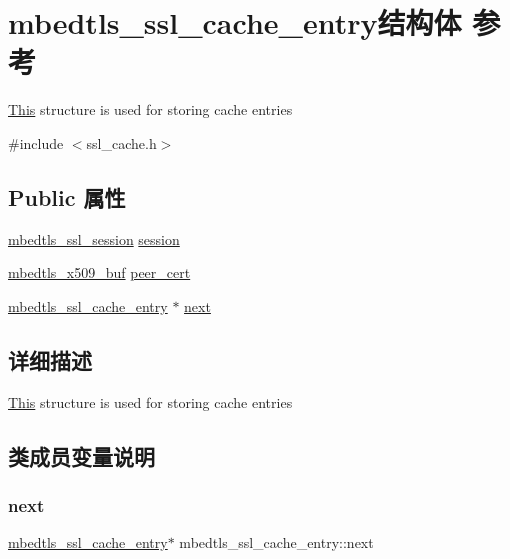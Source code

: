 \hypertarget{structmbedtls__ssl__cache__entry}{}\section{mbedtls\+\_\+ssl\+\_\+cache\+\_\+entry结构体 参考}
\label{structmbedtls__ssl__cache__entry}


\hyperlink{namespace_this}{This} structure is used for storing cache entries  




{\ttfamily \#include $<$ssl\+\_\+cache.\+h$>$}

\subsection*{Public 属性}
\begin{DoxyCompactItemize}
\item 
\hyperlink{structmbedtls__ssl__session}{mbedtls\+\_\+ssl\+\_\+session} \hyperlink{structmbedtls__ssl__cache__entry_ade27f016c0924422c5ba5e68650744bc}{session}
\item 
\hyperlink{group__x509__module_ga4d02c9e8e4e2934555e0d132cd2976dc}{mbedtls\+\_\+x509\+\_\+buf} \hyperlink{structmbedtls__ssl__cache__entry_aaa3550f088fef5e3e2ea793076d77a86}{peer\+\_\+cert}
\item 
\hyperlink{structmbedtls__ssl__cache__entry}{mbedtls\+\_\+ssl\+\_\+cache\+\_\+entry} $\ast$ \hyperlink{structmbedtls__ssl__cache__entry_a83fee0c73af53bc816d6a5f2ac795481}{next}
\end{DoxyCompactItemize}


\subsection{详细描述}
\hyperlink{namespace_this}{This} structure is used for storing cache entries 

\subsection{类成员变量说明}
\mbox{\label{structmbedtls__ssl__cache__entry_a83fee0c73af53bc816d6a5f2ac795481}} 
\subsubsection{\texorpdfstring{next}{next}}
{\footnotesize\ttfamily \hyperlink{structmbedtls__ssl__cache__entry}{mbedtls\+\_\+ssl\+\_\+cache\+\_\+entry}$\ast$ mbedtls\+\_\+ssl\+\_\+cache\+\_\+entry\+::next}

